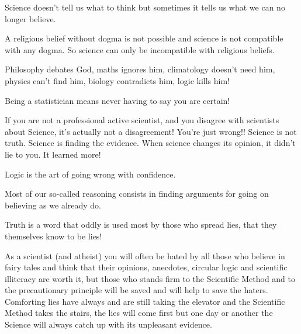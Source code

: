  	\begin{fuquote}Science doesn't tell us what to think but sometimes it tells us what we can no longer believe.
 	\end{fuquote}
 	
 	\begin{fuquote}[?]A religious belief without dogma is not possible and science is not compatible with any dogma. So science can only be incompatible with religious beliefs.
 	\end{fuquote}
 	
 	\begin{fuquote}Philosophy debates God, maths ignores him, climatology doesn't need him, physics can't find him, biology contradicts him, logic kills him!
 	\end{fuquote}
 	
 	\begin{fuquote}[?]Being a statistician means never having to say you are certain!
 	\end{fuquote}
 	
 	\begin{fuquote}[?]If you are not a professional active scientist, and you disagree with scientists about Science, it's actually not a disagreement! You're just wrong!! Science is not truth. Science is finding the evidence. When science changes its opinion, it didn't lie to you. It learned more!
 	\end{fuquote}
 	
 	\begin{fuquote}Logic is the art of going wrong with confidence.
 	\end{fuquote}
 	
 	\begin{fuquote}Most of our so-called reasoning consists in finding arguments for going on believing as we already do.
 	\end{fuquote}
 	
 	\begin{fuquote}[?]Truth is a word that oddly is used most by those who spread lies, that they themselves know to be lies!
 	\end{fuquote}
 	
 	\begin{fuquote}As a scientist (and atheist) you will often be hated by all those who believe in fairy tales and think that their opinions, anecdotes, circular logic and scientific illiteracy are worth it, but those who stands firm to the Scientific Method and to the precautionary principle will be saved and will help to save the haters. Comforting lies have always and are still taking the elevator and the Scientific Method takes the stairs, the lies will come first but one day or another the Science will always catch up with its unpleasant evidence.
 	\end{fuquote}
 	
